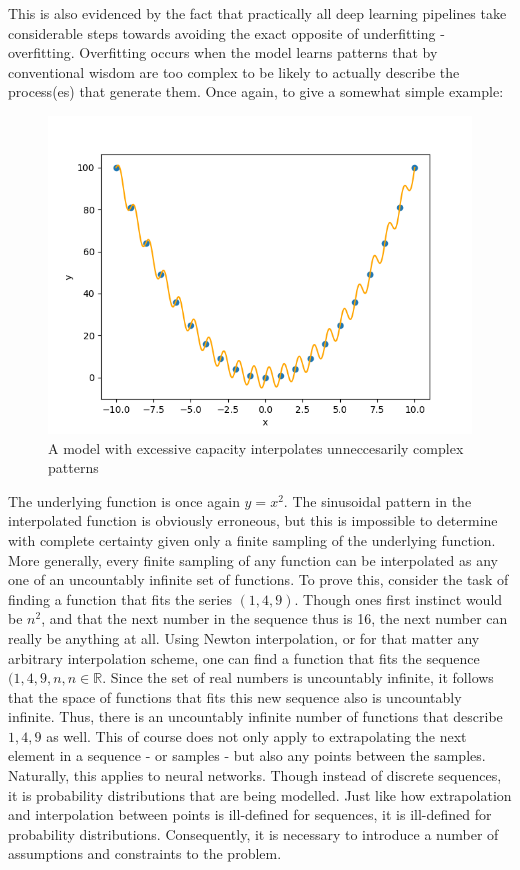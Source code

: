 		This is also evidenced by the fact that practically all deep learning pipelines take considerable steps towards avoiding the exact opposite of underfitting - overfitting. Overfitting occurs when the model learns patterns that by conventional wisdom are too complex to be likely to actually describe the process(es) that generate them. Once again, to give a somewhat simple example: 
		\begin{figure}[H]
			\includegraphics[width=\linewidth]{illustrations/overfit.png}
			\caption{A model with excessive capacity interpolates unneccesarily complex patterns}
			\label{Overfit example}
		\end{figure}
		The underlying function is once again \(y=x^2\). The sinusoidal pattern in the interpolated function is obviously erroneous, but this is impossible to determine with complete certainty given only a finite sampling of the underlying function. More generally, every finite sampling of any function can be interpolated as any one of an uncountably infinite set of functions. To prove this, consider the task of finding a function that fits the series \((1,4,9)\). Though ones first instinct would be \(n^2\), and that the next number in the sequence thus is 16, the next number can really be anything at all. Using Newton interpolation, or for that matter any arbitrary interpolation scheme, one can find a function that fits the sequence \((1,4,9,n, n \in \mathbb{R}\). Since the set of real numbers is uncountably infinite, it follows that the space of functions that fits this new sequence also is uncountably infinite. Thus, there is an uncountably infinite number of functions that describe \(1,4,9\) as well. This of course does not only apply to extrapolating the next element in a sequence - or samples - but also any points between the samples. 
		Naturally, this applies to neural networks. Though instead of discrete sequences, it is probability distributions that are being modelled. Just like how extrapolation and interpolation between points is ill-defined for sequences, it is ill-defined for probability distributions. Consequently, it is necessary to introduce a number of assumptions and constraints to the problem. 
		
